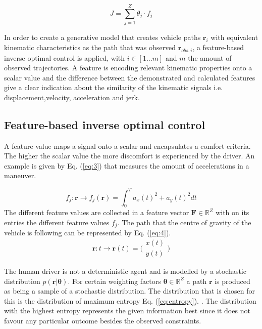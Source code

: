 \begin{equation}\label{eq:1}
	J = \sum_{j=1}^{Z}\theta_j\cdot f_j	
\end{equation}


In order to create a generative model that creates vehicle paths $\bm{r}_i$ with equivalent kinematic characteristics as the path that was observed $\bm{r}_{obs,i}$, a feature-based inverse optimal control is applied, with $i \in [1 ... m]$ and $m$ the amount of observed trajectories.\cite{Kuderer2015a,Abbeel2004} A feature is encoding relevant kinematic properties onto a scalar value and the difference between the demonstrated and calculated features give a clear indication about the similarity of the kinematic signals i.e. displacement,velocity, acceleration and jerk. \\

\subsection{Feature-based inverse optimal control}
A feature value maps a signal onto a scalar and encapsulates a comfort criteria. The higher the scalar value the more discomfort is experienced by the driver. An example is given by Eq. (\ref{eq:3}) that measures the amount of accelerations in a maneuver.

\begin{equation}\label{eq:3}
f_j:\bm{r}\xrightarrow{}f_j(\bm{r})=\int_{0}^{T}a_x(t)^{2}+a_y(t)^{2} dt
\end{equation}
The different feature values are collected in a feature vector $\bm{F} \in \mathbb{R}^Z$ with on its entries the different feature values $f_j$.
The path that the centre of gravity of the vehicle is following can be represented by Eq. (\ref{eq:4}).
\begin{equation}\label{eq:4}
\bm{r}:t \xrightarrow{}\bm{r}(t) =  \bigl( \begin{smallmatrix} x(t)\\ y(t) \end{smallmatrix}\bigr)
\end{equation}

The human driver is not a deterministic agent and is modelled by a stochastic distribution $p(\bm{r}|\bm{\theta})$. For certain weighting factors $\bm{\theta} \in \mathbb{R}^Z$ a path $\bm{r}$ is produced as being a sample of a stochastic distribution. The distribution that is chosen for this is the distribution of maximum entropy Eq. (\ref{eq:entropy}). \cite{Ziebart2008}. 
The distribution with the highest entropy represents the given information best since it does not favour any particular outcome besides the observed constraints. \cite{Abbeel2004}
	

